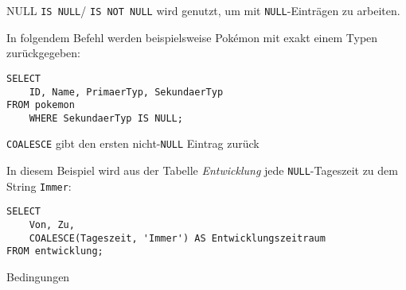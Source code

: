 \begin{bonus}{NULL}
    \texttt{IS NULL}/ \texttt{IS NOT NULL} wird genutzt, um mit \texttt{NULL}-Einträgen zu arbeiten.

    In folgendem Befehl werden beispielsweise Pokémon mit exakt einem Typen zurückgegeben:

    \begin{verbatim}
SELECT
    ID, Name, PrimaerTyp, SekundaerTyp
FROM pokemon
    WHERE SekundaerTyp IS NULL;
    \end{verbatim}

    

    \texttt{COALESCE} gibt den ersten nicht-\texttt{NULL} Eintrag zurück

    In diesem Beispiel wird aus der Tabelle \emph{Entwicklung} jede \texttt{NULL}-Tageszeit zu dem String \texttt{Immer}:

    \begin{verbatim}
SELECT
    Von, Zu,
    COALESCE(Tageszeit, 'Immer') AS Entwicklungszeitraum
FROM entwicklung;
    \end{verbatim}

    
\end{bonus}

\begin{code}{Bedingungen}
    
\end{code}